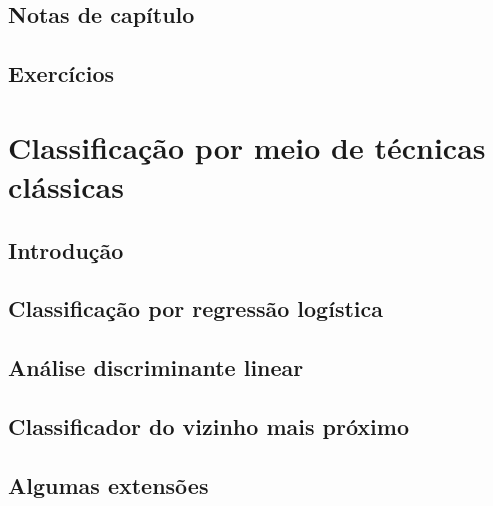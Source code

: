 \documentclass[
]{latex/krantz}
\theoremstyle{definition}
\theoremstyle{definition}
\theoremstyle{definition}
\theoremstyle{definition}
\theoremstyle{remark}
\begin{document}
\hypertarget{notas-de-capuxedtulo-6}{%
\section{Notas de capítulo}\label{notas-de-capuxedtulo-6}}

\hypertarget{exercuxedcios-6}{%
\section{Exercícios}\label{exercuxedcios-6}}

\hypertarget{classificauxe7uxe3o-por-meio-de-tuxe9cnicas-cluxe1ssicas}{%
\chapter{Classificação por meio de técnicas clássicas}\label{classificauxe7uxe3o-por-meio-de-tuxe9cnicas-cluxe1ssicas}}

\hypertarget{introduuxe7uxe3o-7}{%
\section{Introdução}\label{introduuxe7uxe3o-7}}

\hypertarget{classificauxe7uxe3o-por-regressuxe3o-loguxedstica}{%
\section{Classificação por regressão logística}\label{classificauxe7uxe3o-por-regressuxe3o-loguxedstica}}

\hypertarget{anuxe1lise-discriminante-linear}{%
\section{Análise discriminante linear}\label{anuxe1lise-discriminante-linear}}

\hypertarget{classificador-do-vizinho-mais-pruxf3ximo}{%
\section{Classificador do vizinho mais próximo}\label{classificador-do-vizinho-mais-pruxf3ximo}}

\hypertarget{algumas-extensuxf5es}{%
\section{Algumas extensões}\label{algumas-extensuxf5es}}
\end{document}
